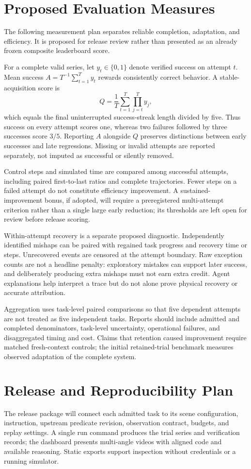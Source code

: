 \documentclass[11pt]{article}
\begin{document}
\section{Proposed Evaluation Measures}
The following measurement plan separates reliable completion, adaptation, and efficiency. It is proposed for release review rather than presented as an already frozen composite leaderboard score.

For a complete valid series, let $y_t\in\{0,1\}$ denote verified success on attempt $t$. Mean success $A=T^{-1}\sum_{t=1}^{T}y_t$ rewards consistently correct behavior. A stable-acquisition score is
\[
 Q=\frac{1}{T}\sum_{t=1}^{T}\prod_{j=t}^{T}y_j,
\]
which equals the final uninterrupted success-streak length divided by five. Thus success on every attempt scores one, whereas two failures followed by three successes score $3/5$. Reporting $A$ alongside $Q$ preserves distinctions between early successes and late regressions. Missing or invalid attempts are reported separately, not imputed as successful or silently removed.

Control steps and simulated time are compared among successful attempts, including paired first-to-last ratios and complete trajectories. Fewer steps on a failed attempt do not constitute efficiency improvement. A sustained-improvement bonus, if adopted, will require a preregistered multi-attempt criterion rather than a single large early reduction; its thresholds are left open for review before release scoring.

Within-attempt recovery is a separate proposed diagnostic. Independently identified mishaps can be paired with regained task progress and recovery time or steps. Unrecovered events are censored at the attempt boundary. Raw exception counts are not a headline penalty: exploratory mistakes can support later success, and deliberately producing extra mishaps must not earn extra credit. Agent explanations help interpret a trace but do not alone prove physical recovery or accurate attribution.

Aggregation uses task-level paired comparisons so that five dependent attempts are not treated as five independent tasks. Reports should include admitted and completed denominators, task-level uncertainty, operational failures, and disaggregated timing and cost. Claims that retention caused improvement require matched fresh-context controls; the initial retained-trial benchmark measures observed adaptation of the complete system.

\section{Release and Reproducibility Plan}
The release package will connect each admitted task to its scene configuration, instruction, upstream predicate revision, observation contract, budgets, and replay settings. A single run command produces the trial series and verification records; the dashboard presents multi-angle videos with aligned code and available reasoning. Static exports support inspection without credentials or a running simulator.
\end{document}
